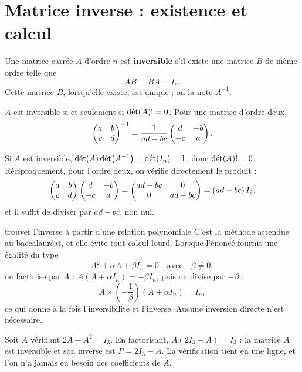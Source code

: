 \section{Matrice inverse : existence et calcul}

\begin{definition}
Une matrice carrée $A$ d'ordre $n$ est \textbf{inversible} s'il existe une
matrice $B$ de même ordre telle que
\[
  AB = BA = I_{n}.
\]
Cette matrice $B$, lorsqu'elle existe, est unique ; on la note $A^{-1}$.
\end{definition}

\begin{theoreme}
$A$ est inversible si et seulement si $\operatorname{d\acute{e}t}(A) != 0$. Pour une matrice
d'ordre deux,
\[
  \begin{pmatrix} a & b \\ c & d \end{pmatrix}^{-1}
  = \frac{1}{ad-bc}\begin{pmatrix} d & -b \\ -c & a \end{pmatrix}.
\]
\end{theoreme}

\begin{demonstration}
Si $A$ est inversible, $\operatorname{d\acute{e}t}(A)\operatorname{d\acute{e}t}\!\left(A^{-1}\right) = \operatorname{d\acute{e}t}(I_{n}) = 1$,
donc $\operatorname{d\acute{e}t}(A) != 0$. Réciproquement, pour l'ordre deux, on vérifie
directement le produit :
\[
  \begin{pmatrix} a & b \\ c & d \end{pmatrix}\begin{pmatrix} d & -b \\ -c & a \end{pmatrix}
  = \begin{pmatrix} ad-bc & 0 \\ 0 & ad-bc \end{pmatrix} = (ad-bc)\,I_{2},
\]
et il suffit de diviser par $ad-bc$, non nul.
\end{demonstration}

\begin{methode}{trouver l'inverse à partir d'une relation polynomiale}
C'est la méthode attendue au baccalauréat, et elle évite tout calcul lourd.
Lorsque l'énoncé fournit une égalité du type
\[
  A^{2}+\alpha A+\beta I_{n} = 0 \quad\text{avec}\quad \beta \neq 0,
\]
on factorise par $A$ :
$A\left(A+\alpha I_{n}\right) = -\beta I_{n}$, puis on divise par $-\beta$ :
\[
  A \times \left(-\frac{1}{\beta}\right)\left(A+\alpha I_{n}\right) = I_{n},
\]
ce qui donne à la fois l'inversibilité et l'inverse. Aucune inversion directe
n'est nécessaire.
\end{methode}

\begin{exemple}
Soit $A$ vérifiant $2A-A^{2} = I_{3}$. En factorisant,
$A\left(2I_{3}-A\right) = I_{3}$ : la matrice $A$ est inversible et son
inverse est $P = 2I_{3}-A$. La vérification tient en une ligne, et l'on
n'a jamais eu besoin des coefficients de $A$.
\end{exemple}

